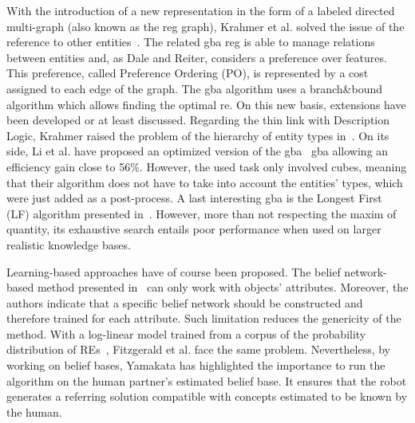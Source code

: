 With the introduction of a new representation in the form of a labeled directed multi-graph (also known as the \acrshort{reg} graph), Krahmer et al. solved the issue of the reference to other entities~\cite{krahmer_2003_graph}. The related \acrfull{gba} \acrshort{reg} is able to manage relations between entities and, as Dale and Reiter, considers a preference over features. This preference, called Preference Ordering (PO), is represented by a cost assigned to each edge of the graph. The \acrshort{gba} algorithm uses a branch\&bound algorithm which allows finding the optimal \acrshort{re}. On this new basis, extensions have been developed or at least discussed. Regarding the thin link with Description Logic, Krahmer raised the problem of the hierarchy of entity types in~\cite{krahmer_2012_computational}. On its side, Li et al. have proposed an optimized version of the \acrshort{gba}~\cite{li_2017_automatically} \acrshort{gba} allowing an efficiency gain close to 56\%. However, the used task only involved cubes, meaning that their algorithm does not have to take into account the entities' types, which were just added as a post-process. A last interesting \acrshort{gba} is the Longest First (LF) algorithm presented in~\cite{viethen_2013_graphs}. However, more than not respecting the maxim of quantity, its exhaustive search entails poor performance when used on larger realistic knowledge bases.

Learning-based approaches have of course been proposed. The belief network-based method presented in~\cite{yamakata_2004_belief} can only work with objects' attributes. Moreover, the authors indicate that a specific belief network should be constructed and therefore trained for each attribute. Such limitation reduces the genericity of the method. With a log-linear model trained from a corpus of the probability distribution of REs~\cite{fitzgerald_2013_learning}, Fitzgerald et al. face the same problem. Nevertheless, by working on belief bases, Yamakata has highlighted the importance to run the algorithm on the human partner's estimated belief base. It ensures that the robot generates a referring solution compatible with concepts estimated to be known by the human.

